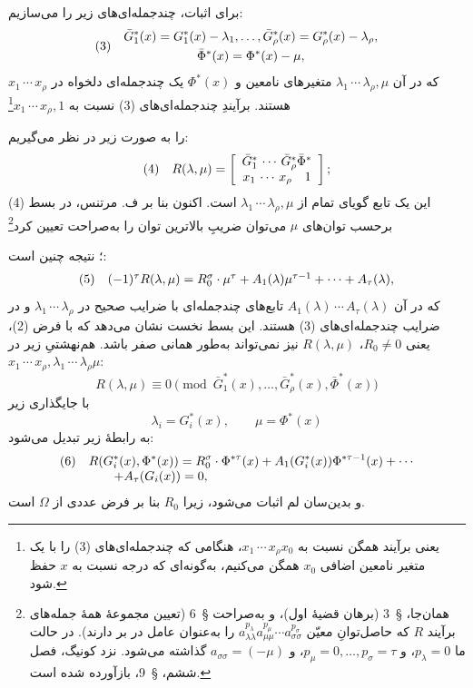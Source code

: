 \documentclass[11pt]{article}
\newcommand{\srcLTR}[1]{\relax\ifmmode\text{\mbox{\babelsublr{\foreignlanguage{english}{#1}}}}\else\babelsublr{\foreignlanguage{english}{#1}}\fi}
\newcommand{\srcfn}[2]{\begingroup\renewcommand{\thefootnote}{\srcLTR{#1}}\footnote{#2}\addtocounter{footnote}{-1}\endgroup}
\providecommand{\rcdots}{\,\cdots\,}
\begin{document}
برای اثبات، چندجمله‌ای‌های زیر را می‌سازیم:
\[
\begin{array}{@{}l@{\quad}c@{}}
(3)& \begin{gathered}
\bar G_1^*(x)=G_1^*(x)-\lambda_1,\ldots,\bar G_\rho^*(x)=G_\rho^*(x)-\lambda_\rho,\\
\bar\Phi^*(x)=\Phi^*(x)-\mu,
\end{gathered}
\end{array}
\]
که در آن $\lambda_1\rcdots\lambda_\rho,\mu$ متغیرهای نامعین و $\Phi^*(x)$ یک چندجمله‌ای دلخواه در $x_1\rcdots x_\rho$ هستند. برآیندِ چندجمله‌ای‌های (3) نسبت به $x_1\rcdots x_\rho,1$\srcfn{**)}{یعنی برآیند همگن نسبت به $x_1\rcdots x_\rho x_0$، هنگامی که چندجمله‌ای‌های (3) را با یک متغیر نامعین اضافی $x_0$ همگن می‌کنیم، به‌گونه‌ای که درجه نسبت به $x$ حفظ شود.} را به صورت زیر در نظر می‌گیریم:
\[
\begin{array}{@{}l@{\quad}c@{}}
(4)& \displaystyle R(\lambda,\mu)=\left[\begin{array}{cc} \bar G_1^*\rcdots \bar G_\rho^*\bar\Phi^*\\ x_1\rcdots x_\rho\quad 1\end{array}\right];
\end{array}
\]
این یک تابع گویای تمام از $\lambda_1\rcdots\lambda_\rho,\mu$ است. اکنون بنا بر ف. مرتنس، در بسط (4) برحسب توان‌های $\mu$ می‌توان ضریبِ بالاترین توان را به‌صراحت تعیین کرد\srcfn{***)}{همان‌جا، \S\ 3 (برهان قضیهٔ اول)، و به‌صراحت \S\ 6 (تعیین مجموعهٔ همهٔ جمله‌های برآیند $R$ که حاصل‌توانِ معیّن $a_{\lambda\lambda}^{p_\lambda}a_{\mu\mu}^{p_\mu}\cdots a_{\sigma\sigma}^{p_\sigma}$ را به‌عنوان عامل در بر دارند). در حالت ما $p_\lambda=0$، و $p_\mu=0,\ldots,p_\sigma=\tau$، و $a_{\sigma\sigma}=(-\mu)$ گذاشته می‌شود. نزد کونیگ، فصل ششم، \S\ 9، بازآورده شده است.}؛ نتیجه چنین است:
\[
\begin{array}{@{}l@{\quad}c@{}}
(5)& (-1)^\tau R(\lambda,\mu)=R_0^\sigma\cdot\mu^\tau+A_1(\lambda)\mu^{\tau-1}+\cdots+A_\tau(\lambda),
\end{array}
\]
که در آن $A_1(\lambda)\rcdots A_\tau(\lambda)$ تابع‌های چندجمله‌ای با ضرایب صحیح در $\lambda_1\rcdots\lambda_\rho$ و در ضرایب چندجمله‌ای‌های (3) هستند. این بسط نخست نشان می‌دهد که با فرض (2)، یعنی $R_0\ne0$، $R(\lambda,\mu)$ نیز نمی‌تواند به‌طور همانی صفر باشد. هم‌نهشتیِ زیر در $x_1\rcdots x_\rho,\lambda_1\rcdots\lambda_\rho\mu$:
\[
R(\lambda,\mu)\equiv0\pmod{\bar G_1^*(x),\ldots,\bar G_\rho^*(x),\bar\Phi^*(x)}
\]
با جایگذاری زیر
\[
\lambda_i=G_i^*(x),\qquad \mu=\Phi^*(x)
\]
به رابطهٔ زیر تبدیل می‌شود:
\[
\begin{array}{@{}l@{\quad}l@{}}
(6)& \displaystyle R(G_i^*(x),\Phi^*(x))=R_0^\sigma\cdot\Phi^{*\tau}(x)+A_1(G_i^*(x))\Phi^{*\tau-1}(x)+\cdots\\
& \displaystyle\qquad +A_\tau(G_i(x))=0,
\end{array}
\]
و بدین‌سان لم اثبات می‌شود، زیرا $R_0$ بنا بر فرض عددی از $\Omega$ است.
\end{document}
